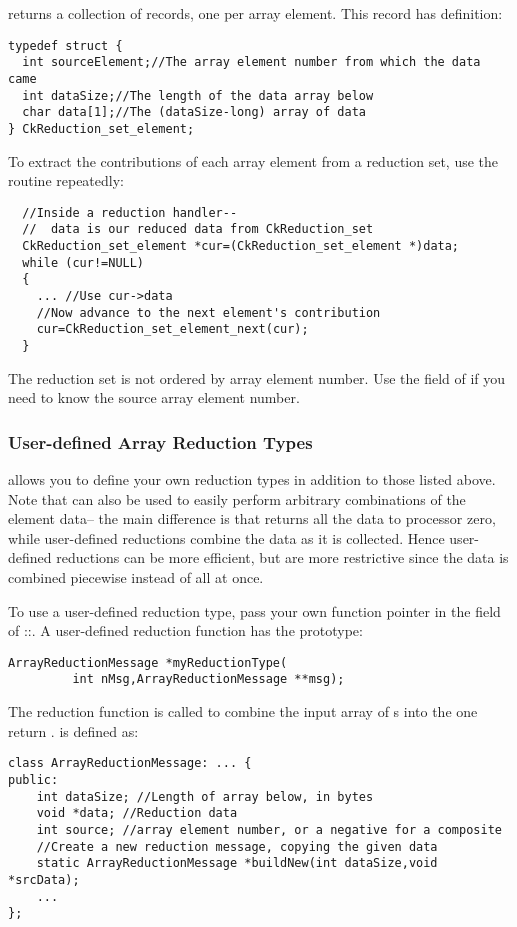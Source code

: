  returns a collection of  records, one per array element.  This record has definition:
\begin{verbatim}
typedef struct {
  int sourceElement;//The array element number from which the data came
  int dataSize;//The length of the data array below
  char data[1];//The (dataSize-long) array of data
} CkReduction_set_element;
\end{verbatim}

To extract the contributions of each array element from a reduction set, use the  routine repeatedly:
\begin{verbatim}
  //Inside a reduction handler-- 
  //  data is our reduced data from CkReduction_set
  CkReduction_set_element *cur=(CkReduction_set_element *)data;
  while (cur!=NULL)
  {
    ... //Use cur->data
    //Now advance to the next element's contribution
    cur=CkReduction_set_element_next(cur);
  }
\end{verbatim}

The reduction set is not ordered by array element number.  Use the  field of  if you need to know the source array element number.

\subsubsection{User-defined Array Reduction Types}
\charmpp allows you to define your own reduction types in addition to those listed above.  Note that  can also be used to easily perform arbitrary combinations of the element data-- the main difference is that  returns all the data to processor zero, while user-defined reductions combine the data as it is collected.  Hence user-defined reductions can be more efficient, but are more restrictive since the data is combined piecewise instead of all at once.

To use a user-defined reduction type, pass your own function pointer in the  field of ::.  A user-defined reduction function has the prototype:
\begin{verbatim}
ArrayReductionMessage *myReductionType(
         int nMsg,ArrayReductionMessage **msg);
\end{verbatim}

The reduction function is called to combine the input array of  s into the one return .   is defined as:
\begin{verbatim}
class ArrayReductionMessage: ... {
public:
    int dataSize; //Length of array below, in bytes
    void *data; //Reduction data
    int source; //array element number, or a negative for a composite
    //Create a new reduction message, copying the given data
    static ArrayReductionMessage *buildNew(int dataSize,void *srcData);
    ...
};
\end{verbatim}


